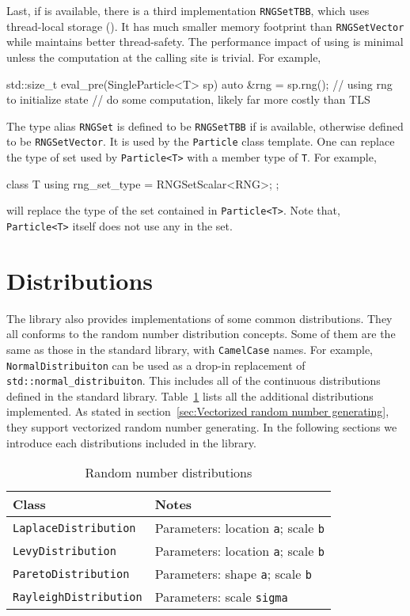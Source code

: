 Last, if \tbb is available, there is a third implementation \verb|RNGSetTBB|,
which uses thread-local storage (\tls). It has much smaller memory footprint
than \verb|RNGSetVector| while maintains better thread-safety. The performance
impact of using \tls is minimal unless the computation at the calling site is
trivial. For example,
\begin{cppcode}
  std::size_t eval_pre(SingleParticle<T> sp)
  {
      auto &rng = sp.rng();
      // using rng to initialize state
      // do some computation, likely far more costly than TLS
  }
\end{cppcode}
The type alias \verb|RNGSet| is defined to be \verb|RNGSetTBB| if \tbb is
available, otherwise defined to be \verb|RNGSetVector|. It is used by the
\verb|Particle| class template. One can replace the type of \rng set used by
\verb|Particle<T>| with a member type of \verb|T|. For example,
\begin{cppcode}
  class T
  {
      using rng_set_type = RNGSetScalar<RNG>;
  };
\end{cppcode}
will replace the type of the \rng set contained in \verb|Particle<T>|. Note
that, \verb|Particle<T>| itself does not use any \rng in the set.

\section{Distributions}
\label{sec:Distributions}

The library also provides implementations of some common distributions. They
all conforms to the \cppoo random number distribution concepts. Some of them
are the same as those in the \cppoo standard library, with \verb|CamelCase|
names. For example, \verb|NormalDistribuiton| can be used as a drop-in
replacement of \verb|std::normal_distribuiton|. This includes all of the
continuous distributions defined in the standard library.
Table~\ref{tab:Random number distributions} lists all the additional
distributions implemented. As stated in section~\ref{sec:Vectorized random
  number generating}, they support vectorized random number generating. In the
following sections we introduce each distributions included in the library.

\begin{table}
  \begin{tabularx}{\textwidth}{lX}
    \toprule
    Class & Notes \\
    \midrule
    \verb|LaplaceDistribution|
    & Parameters: location \verb|a|; scale \verb|b| \\
    \verb|LevyDistribution|
    & Parameters: location \verb|a|; scale \verb|b| \\
    \verb|ParetoDistribution|
    & Parameters: shape \verb|a|; scale \verb|b| \\
    \verb|RayleighDistribution|
    & Parameters: scale \verb|sigma| \\
    \bottomrule
  \end{tabularx}
  \caption{Random number distributions}
  \label{tab:Random number distributions}
\end{table}

